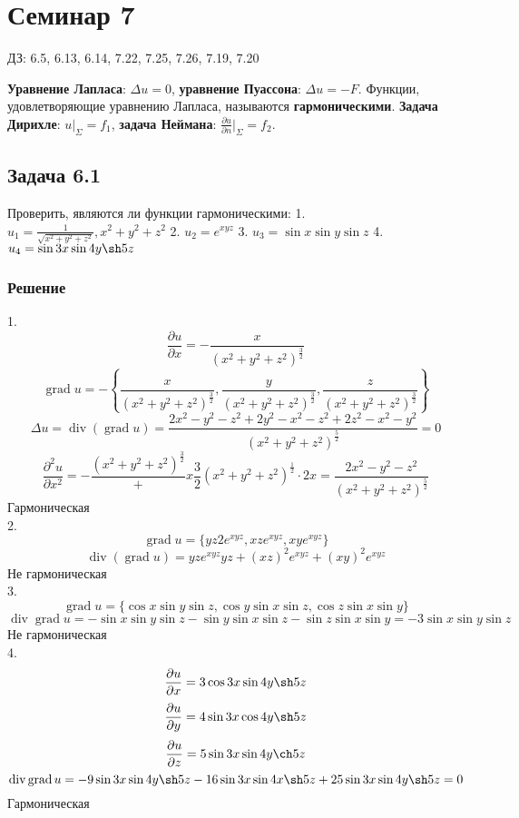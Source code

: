 \documentclass[11pt]{article}
\def\zall{\setcounter{lem}{0}\setcounter{cnsqnc}{0}\setcounter{th}{0}\setcounter{Cmt}{0}\setcounter{equation}{0}}
\newcounter{lem}\setcounter{lem}{0}
\newcounter{th}\setcounter{th}{0}
\newcounter{cnsqnc}\setcounter{cnsqnc}{0}
\newcounter{Cmt}\setcounter{Cmt}{0}
\begin{document}
\section{Семинар 7}
\label{sec:orgfe2498a}
\zall
ДЗ: 6.5, 6.13, 6.14, 7.22, 7.25, 7.26, 7.19, 7.20

\textbf{Уравнение Лапласа}: \(\Delta u = 0\), \textbf{уравнение Пуассона}: \(\Delta u = -F\).
Функции, удовлетворяющие уравнению Лапласа, называются \textbf{гармоническими}.
\textbf{Задача Дирихле}: \(u|_{\Sigma} = f_1\), \textbf{задача Неймана}: \(\frac{\partial u}{\partial n}|_{\Sigma} = f_2\).
\subsection{Задача 6.1}
\label{sec:orgc501d34}
Проверить, являются ли функции гармоническими:
1. $u_1 = \frac1{\sqrt{x^2 + y^2 + z^2}}, x^2 + y^2 + z^2$
2. $u_2 = e^{xyz}$
3. $u_3 = \sin x\sin y\sin z$
4. $u_4 = \sin 3x\sin 4y\sh 5z$
\subsubsection{Решение}
\label{sec:orgae66a51}
1.
$$\frac{\partial u}{\partial x} = -\frac{x}{(x^2 + y^2 + z^2)^{\frac32}}$$
$$\operatorname{grad}u = -\left\{\frac{x}{(x^2 + y^2 + z^2)^{\frac32}}, \frac{y}{(x^2 + y^2 + z^2)^{\frac32}}, \frac{z}{(x^2 + y^2 + z^2)^{\frac32}}\right\}$$
$$\Delta u = \operatorname{div}(\operatorname{grad}u) = \frac{2x^2 - y^2 - z^2 + 2y^2 - x^2 - z^2 + 2z^2 - x^2 - y^2}{(x^2 + y^2 + z^2)^{\frac52}} = 0$$
$$\frac{\partial^2u}{\partial x^2} = -\frac{(x^2 + y^2 + z^2)^{\frac32}} + x\frac32(x^2 + y^2 + z^2)^{\frac12}\cdot2x = \frac{2x^2 - y^2 - z^2}{(x^2 + y^2 + z^2)^{\frac52}}$$
Гармоническая\\
2. 
$$\operatorname{grad}u = \{yz2e^{xyz}, xze^{xyz}, xye^{xyz}\}$$
$$\operatorname{div}(\operatorname{grad}u) = yze^{xyz}yz + (xz)^2e^{xyz} + (xy)^2e^{xyz}$$
Не гармоническая\\
3.
$$\operatorname{grad}u = \{\cos x\sin y\sin z, \cos y\sin x\sin z, \cos z\sin x\sin y\}$$
$$\operatorname{div}\operatorname{grad}u = -\sin x\sin y\sin z - \sin y\sin x\sin z - \sin z\sin x\sin y = -3\sin x\sin y\sin z$$
Не гармоническая\\
4.
$$\frac{\partial u}{\partial x} = 3\cos 3x\sin 4y\sh 5z$$
$$\frac{\partial u}{\partial y} = 4\sin 3x\cos 4y\sh 5z$$
$$\frac{\partial u}{\partial z} = 5\sin 3x\sin 4y\ch 5z$$
$$\operatorname{div}\operatorname{grad}u = -9\sin 3x\sin 4y\sh 5z - 16\sin 3x\sin 4x\sh 5z + 25\sin 3x\sin 4y\sh 5z = 0$$
Гармоническая
\end{document}

